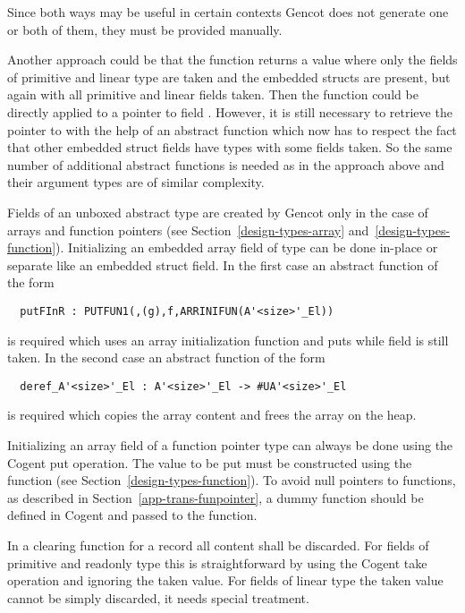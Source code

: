 Since both ways may be useful in certain contexts Gencot does not generate one or both of them, they must be provided manually.

Another approach could be that the function  returns a value where only the fields of primitive and linear type
are taken and the embedded structs are present, but again with all primitive and linear fields taken. Then the function 
could be directly applied to a pointer to field . However, it is still necessary to retrieve the pointer to 
with the help of an abstract function which now has to respect the fact that other embedded struct fields have types with
some fields taken. So the same number of additional abstract functions is needed as in the approach above and their argument
types are of similar complexity.

Fields of an unboxed abstract type are created by Gencot only in the case of arrays and function pointers (see 
Section~\ref{design-types-array} and~\ref{design-types-function}). Initializing an embedded array field  of type 
 can be done in-place or separate like an embedded struct field. In the first case an abstract
function of the form 
\begin{verbatim}
  putFInR : PUTFUN1(,(g),f,ARRINIFUN(A'<size>'_El))
\end{verbatim}
is required which uses an array initialization function and puts  while field  is still taken. 
In the second case an abstract function of the form
\begin{verbatim}
  deref_A'<size>'_El : A'<size>'_El -> #UA'<size>'_El
\end{verbatim}
is required which copies the array content and frees the array on the heap.

Initializing an array field  of a function pointer type  can always be done using the Cogent put operation.
The value to be put must be constructed using the function  (see Section~\ref{design-types-function}). To
avoid null pointers to functions, as described in Section~\ref{app-trans-funpointer}, a dummy function should be defined in
Cogent and passed to the  function.

In a clearing function for a record all content shall be discarded. For fields of primitive and readonly type this is
straightforward by using the Cogent take operation and ignoring the taken value. For fields of linear type the taken value
cannot be simply discarded, it needs special treatment.

